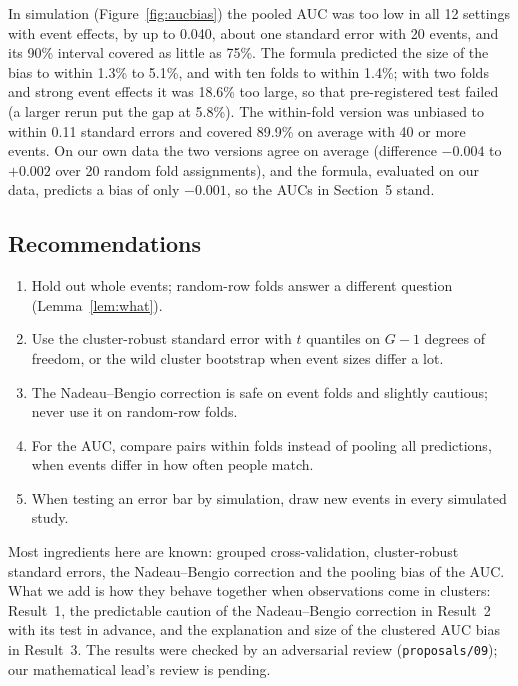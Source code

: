 In simulation (Figure~\ref{fig:aucbias}) the pooled AUC was too low in all 12 settings with event effects, by up to
0.040, about one standard error with 20 events, and its 90\% interval covered as little as 75\%. The formula predicted
the size of the bias to within 1.3\% to 5.1\%, and with ten folds to within 1.4\%; with two folds and strong event
effects it was 18.6\% too large, so that pre-registered test failed (a larger rerun put the gap at 5.8\%). The
within-fold version was unbiased to within 0.11 standard errors and covered 89.9\% on average with 40 or more events.
On our own data the two versions agree on average (difference $-0.004$ to $+0.002$ over 20 random fold assignments),
and the formula, evaluated on our data, predicts a bias of only $-0.001$, so the AUCs in Section~5 stand.

\subsection{Recommendations}

\begin{enumerate}
\item Hold out whole events; random-row folds answer a different question (Lemma~\ref{lem:what}).
\item Use the cluster-robust standard error with $t$ quantiles on $G-1$ degrees of freedom, or the wild cluster
bootstrap when event sizes differ a lot.
\item The Nadeau--Bengio correction is safe on event folds and slightly cautious; never use it on random-row folds.
\item For the AUC, compare pairs within folds instead of pooling all predictions, when events differ in how often
people match.
\item When testing an error bar by simulation, draw new events in every simulated study.
\end{enumerate}

Most ingredients here are known: grouped cross-validation, cluster-robust standard errors, the Nadeau--Bengio
correction and the pooling bias of the AUC. What we add is how they behave together when observations come in
clusters: Result~1, the predictable caution of the Nadeau--Bengio correction in Result~2 with its test in advance, and the
explanation and size of the clustered AUC bias in Result~3. The results were checked by an adversarial review
(\texttt{proposals/09}); our mathematical lead's review is pending.
